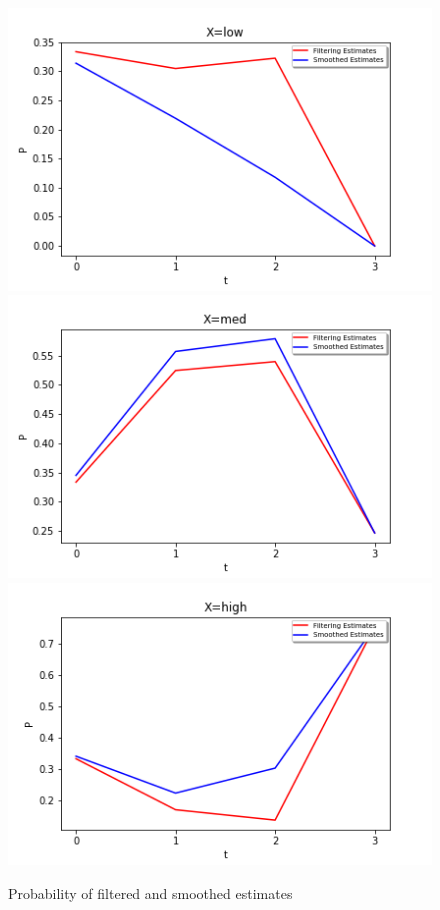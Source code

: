 \documentclass[letter, 9pt]{article}
\begin{document}
\begin{figure}[H]
        \centering
        \includegraphics[width=\textwidth]{HW3/low.png}
    \endminipage\hfill
        \centering
        \includegraphics[width=\textwidth]{HW3/med.png}
    \endminipage\hfill
        \centering
        \includegraphics[width=\textwidth]{HW3/high.png}
    \endminipage\hfill
    \caption{Probability of filtered and smoothed estimates}
\end{figure}
\end{document}
